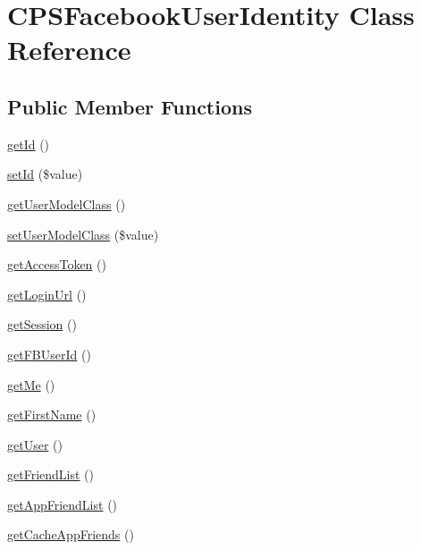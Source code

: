 \hypertarget{classCPSFacebookUserIdentity}{
\section{CPSFacebookUserIdentity Class Reference}
\label{classCPSFacebookUserIdentity}
}
\subsection*{Public Member Functions}
\begin{DoxyCompactItemize}
\item 
\hyperlink{classCPSFacebookUserIdentity_a12251d0c022e9e21c137a105ff683f13}{getId} ()
\item 
\hyperlink{classCPSFacebookUserIdentity_aa664eee45a9eb336b581131cb0ac667d}{setId} (\$value)
\item 
\hyperlink{classCPSFacebookUserIdentity_a0b280ce1a525781c8943e5101471a6c0}{getUserModelClass} ()
\item 
\hyperlink{classCPSFacebookUserIdentity_ae0af15a6b8117c8e984beae8e585fcd2}{setUserModelClass} (\$value)
\item 
\hyperlink{classCPSFacebookUserIdentity_a5d251c70a3f9f9daaff7f00ec5f894c0}{getAccessToken} ()
\item 
\hyperlink{classCPSFacebookUserIdentity_a37af09a26efc969d1381851b8c379808}{getLoginUrl} ()
\item 
\hyperlink{classCPSFacebookUserIdentity_aefa4c5bd150e2a7d525576d7959c6911}{getSession} ()
\item 
\hyperlink{classCPSFacebookUserIdentity_a0ef2f4b4ea68bcd957152a5b46a6612e}{getFBUserId} ()
\item 
\hyperlink{classCPSFacebookUserIdentity_a6bc057a9b0c03f8147a4294936b2494b}{getMe} ()
\item 
\hyperlink{classCPSFacebookUserIdentity_ace5f32fc99c7c5989f7576755fc60972}{getFirstName} ()
\item 
\hyperlink{classCPSFacebookUserIdentity_ae81b7186fb97a7c6457edcc68c9aa2ef}{getUser} ()
\item 
\hyperlink{classCPSFacebookUserIdentity_a2e112e7f214a9ffbc1948685a46fc1ee}{getFriendList} ()
\item 
\hyperlink{classCPSFacebookUserIdentity_abcda3e499f474b2b46474d47161154a2}{getAppFriendList} ()
\item 
\hyperlink{classCPSFacebookUserIdentity_ae401a06f8319a26a012457db1d3908ce}{getCacheAppFriends} ()
\item 

\end{DoxyCompactItemize}
